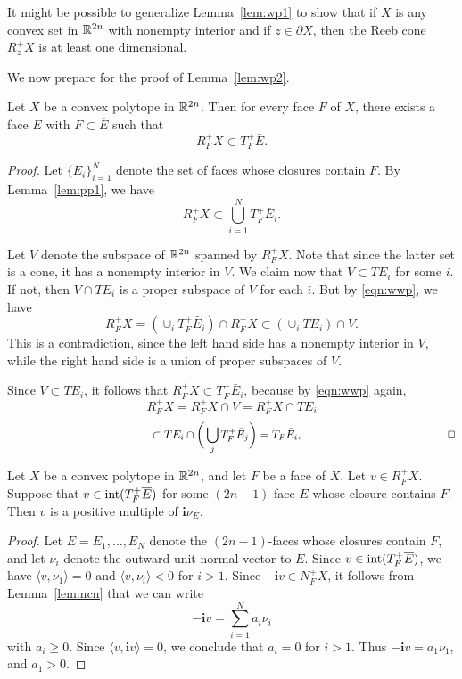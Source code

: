 \begin{remark}
It might be possible to generalize Lemma~\ref{lem:wp1} to show that if $X$ is any convex set in ${\mathbb R}^{2n}$ with nonempty interior and if $z\in\partial X$, then the Reeb cone $R_z^+X$ is at least one dimensional.
\end{remark}

We now prepare for the proof of Lemma~\ref{lem:wp2}.

\begin{lemma} \label{lem:weak_well_posedness_for_polytopes} Let $X$ be a convex polytope in ${\mathbb R}^{2n}$. Then for every face $F$ of $X$, there exists a face $E$ with $F\subset\overline{E}$ such that
\[
R_F^+X \subset T^+_F\bar{E}.
\]
\end{lemma}

\noindent
{\em Proof.\/}
Let $\{E_i\}_{i=1}^N$ denote the set of faces whose closures contain $F$. By Lemma~\ref{lem:pp1}, we have
\begin{equation}
\label{eqn:wwp}
R_F^+X \subset \bigcup_{i=1}^N T_F^+\bar{E}_i.
\end{equation}

Let $V$ denote the subspace of ${\mathbb R}^{2n}$ spanned by $R^+_FX$. Note that since the latter set is a cone, it has a nonempty interior in $V$. We claim now that $V\subset TE_i$ for some $i$. If not, then $V\cap TE_i$ is a proper subspace of $V$ for each $i$. But by \eqref{eqn:wwp}, we have
\[
R^+_FX = \left(\cup_i T^+_F\bar{E}_i\right) \cap R^+_FX \subset \left(\cup_i TE_i\right) \cap V.
\]
This is a contradiction, since the left hand side has a nonempty interior in $V$, while the right hand side is a union of proper subspaces of $V$.

Since $V \subset TE_i$, it follows that $R^+_FX \subset T^+_F\bar{E}_i$, because by \eqref{eqn:wwp} again,
\[
R^+_FX = R^+_FX \cap V = R^+_FX \cap TE_i
\]
\[
\hspace{1.8in}
\subset  TE_i \cap \bigg(\bigcup_j T^+_F\bar{E}_j\bigg) = T_F\bar{E}_i, \hspace{1.8in}\Box
\]

\begin{lemma}
\label{lem:wwp2}
Let $X$ be a convex polytope in ${\mathbb R}^{2n}$, and let $F$ be a face of $X$. Let $v\in R_F^+X$. Suppose that $v\in\operatorname{int}(T_F^+\overline{E})$ for some $(2n-1)$-face $E$ whose closure contains $F$. Then $v$ is a positive multiple of ${\mathbf i}\nu_E$.
\end{lemma}

\begin{proof}
Let $E=E_1,\ldots,E_N$ denote the $(2n-1)$-faces whose closures contain $F$, and let $\nu_i$ denote the outward unit normal vector to $E$. Since $v\in\operatorname{int}(T_F^+\overline{E})$, we have $\langle v,\nu_1\rangle=0$ and $\langle v,\nu_i\rangle < 0$ for $i>1$. Since $-{\mathbf i}v\in N_F^+X$, it follows from Lemma~\ref{lem:ncn} that we can write
\[
-{\mathbf i}v = \sum_{i=1}^Na_i\nu_i
\]
with $a_i\ge 0$. Since $\langle v,{\mathbf i}v\rangle = 0$, we conclude that $a_i=0$ for $i>1$. Thus $-{\mathbf i}v=a_1\nu_1$, and $a_1>0$.
\end{proof}

